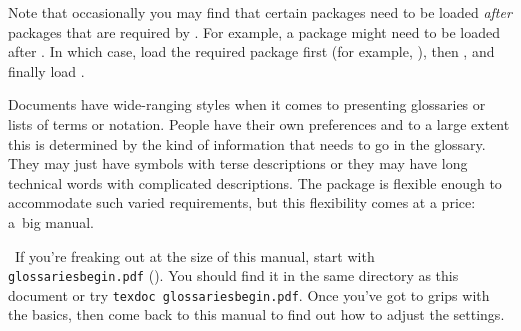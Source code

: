 \documentclass[report,inlinetitle,widecs]{nlctdoc}
\begin{document}
Note that occasionally you may find that certain packages need to be
loaded \emph{after} packages that are required by . For
example, a package  might need to be loaded after . In
which case, load the required package first (for example,
), then , and finally load .

\begin{important}
Documents have wide-ranging styles when it comes to presenting glossaries
or lists of terms or notation. People have their own preferences and
to a large extent this is determined by the kind of information that
needs to go in the glossary. They may just have symbols with
terse descriptions or they may have long technical words with
complicated descriptions. The  package is
flexible enough to accommodate such varied requirements, but this
flexibility comes at a price: a~big manual.

\aargh\ If you're freaking out at the size of this manual, start with
\texttt{glossariesbegin.pdf} (). You should find it in the same directory as this
document or try \texttt{texdoc glossariesbegin.pdf}. Once you've got
to grips with the basics, then come back to this manual to find out
how to adjust the settings.
\end{important}
\end{document}
